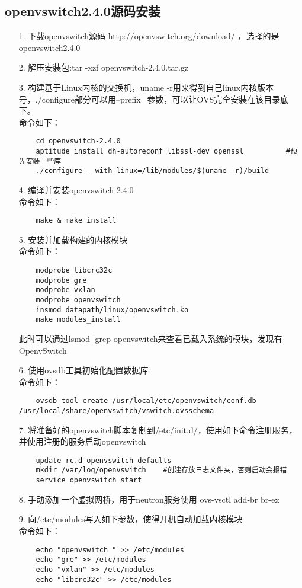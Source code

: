 \documentclass[a4paper,left=1.5cm,right=1.5cm,11pt]{article}
\begin{document}
\subsection{openvswitch2.4.0源码安装}
\begin{itemize}
    \item[1.]下载openvswitch源码 http://openvswitch.org/download/ ，选择的是openvswitch2.4.0
	\item[2.]解压安装包:tar -xzf openvswitch-2.4.0.tar.gz
	\item[3.]构建基于Linux内核的交换机，uname -r用来得到自己linux内核版本号，./configure部分可以用--prefix=参数，可以让OVS完全安装在该目录底下。\\
	命令如下：
	\begin{lstlisting}
	cd openvswitch-2.4.0
	aptitude install dh-autoreconf libssl-dev openssl          #预先安装一些库
	./configure --with-linux=/lib/modules/$(uname -r)/build
	\end{lstlisting}
	\item[4.]编译并安装openvswitch-2.4.0\\
	命令如下：
	\begin{lstlisting}
	make & make install
	\end{lstlisting}
	\item[5.]安装并加载构建的内核模块\\
	命令如下：
	\begin{lstlisting}
	modprobe libcrc32c
	modprobe gre
	modprobe vxlan
	modprobe openvswitch
	insmod datapath/linux/openvswitch.ko
	make modules_install
    \end{lstlisting}
    此时可以通过lsmod |grep openvswitch来查看已载入系统的模块，发现有OpenvSwitch
	\item[6.]使用ovsdb工具初始化配置数据库\\
	命令如下：
	\begin{lstlisting}
	ovsdb-tool create /usr/local/etc/openvswitch/conf.db /usr/local/share/openvswitch/vswitch.ovsschema
    \end{lstlisting}
	\item[7.]将准备好的openvswitch脚本复制到/etc/init.d/，使用如下命令注册服务，并使用注册的服务启动openvswitch
	\begin{lstlisting}
	update-rc.d openvswitch defaults
	mkdir /var/log/openvswitch    #创建存放日志文件夹，否则启动会报错
	service openvswitch start 
	\end{lstlisting}
	\item[8.]手动添加一个虚拟网桥，用于neutron服务使用
	ovs-vsctl add-br br-ex
	\item[9.]向/etc/modules写入如下参数，使得开机自动加载内核模块\\
	命令如下：
	\begin{lstlisting}
	echo "openvswitch " >> /etc/modules
	echo "gre" >> /etc/modules
	echo "vxlan" >> /etc/modules
	echo "libcrc32c" >> /etc/modules
	\end{lstlisting}
\end{itemize}
\end{document}

